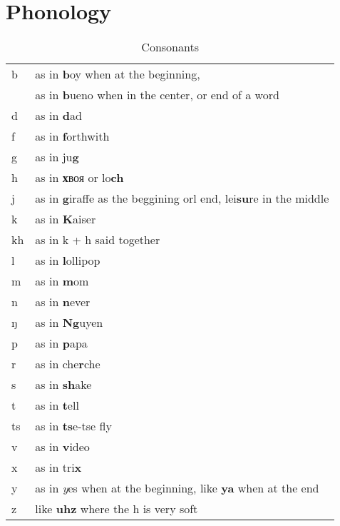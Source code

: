 \chapter*{Phonology}

\begin{table}[ht]
  \caption{Consonants}
  \centering
  \begin{tabular}{ l l }
  \hline\hline
    b & as in \textbf {b}oy when at the beginning, \\
    & as in \textbf{b}ueno when in the center, or end of a word  \\
    d & as in \textbf {d}ad \\
    f & as in \textbf {f}orthwith \\
    g & as in ju\textbf {g} \\
    h & as in \foreignlanguage{russian}{\textbf{х}воя} or lo\textbf {ch} \\
    j & as in \textbf{g}iraffe as the beggining orl end, lei\textbf{su}re in the middle \\
    k & as in \textbf{K}aiser \\
    kh & as in k + h said together \\
    l & as in \textbf{l}ollipop \\
    m & as in \textbf{m}om \\
    n & as in \textbf{n}ever \\
    ŋ & as in \textbf{Ng}uyen \\
    p & as in \textbf{p}apa \\
    r & as in che\textbf{r}che \\
    s & as in \textbf{sh}ake \\
    t & as in \textbf{t}ell \\
    ts & as in \textbf{ts}e-tse fly \\
    v & as in \textbf{v}ideo \\
    x & as in tri\textbf{x} \\
    y & as in \textit{y}es when at the beginning, like \textbf{ya} when at the end \\
    z & like \textbf{uhz} where the h is very soft \\
    \hline
  \end{tabular}
  \label{table:consonants}
\end{table}

